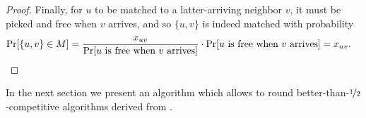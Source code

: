 \begin{proof}
	Finally, for $u$ to be matched to a latter-arriving neighbor $v$, it must be picked and free when $v$ arrives, and so $\{u,v\}$ is indeed matched with probability
	\begin{align*}
	\Pr[\{u,v\}\in M] & = \frac{x_{uv}}{\Pr[\mbox{$u$ is free when $v$ arrives}]} \cdot \Pr[\mbox{$u$ is free when $v$ arrives}] = x_{uv}.\qedhere
	\end{align*}
\end{proof}

In the next section we present an algorithm which allows to round better-than-$\nicefrac{1}{2}$-competitive algorithms derived from .
